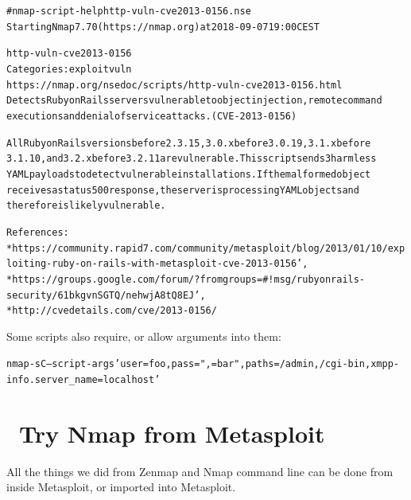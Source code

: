 \documentclass[a4paper,11pt,notitlepage]{report}
\begin{document}
\begin{alltt}
# nmap -script-help http-vuln-cve2013-0156.nse
Starting Nmap 7.70 ( https://nmap.org ) at 2018-09-07 19:00 CEST

http-vuln-cve2013-0156
Categories: exploit vuln
https://nmap.org/nsedoc/scripts/http-vuln-cve2013-0156.html
  Detects Ruby on Rails servers vulnerable to object injection, remote command
  executions and denial of service attacks. (CVE-2013-0156)

  All Ruby on Rails versions before 2.3.15, 3.0.x before 3.0.19, 3.1.x before
  3.1.10, and 3.2.x before 3.2.11 are vulnerable. This script sends 3 harmless
  YAML payloads to detect vulnerable installations. If the malformed object
  receives a status 500 response, the server is processing YAML objects and
  therefore is likely vulnerable.

  References:
  * https://community.rapid7.com/community/metasploit/blog/2013/01/10/exploiting-ruby-on-rails-with-metasploit-cve-2013-0156',
  * https://groups.google.com/forum/?fromgroups=#!msg/rubyonrails-security/61bkgvnSGTQ/nehwjA8tQ8EJ',
  * http://cvedetails.com/cve/2013-0156/
\end{alltt}

Some scripts also require, or allow arguments into them:

\begin{alltt}
  nmap -sC --script-args 'user=foo,pass=",{}=bar",paths={/admin,/cgi-bin},xmpp-info.server_name=localhost'
\end{alltt}

\chapter{\faInfoCircle\ Try Nmap from Metasploit}
\label{ex:dbnmap}

All the things we did from Zenmap and Nmap command line can be done from inside Metasploit, or imported into Metasploit.
\end{document}
